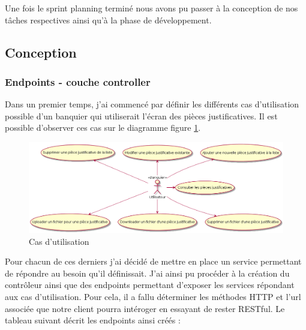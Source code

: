 	Une fois le sprint planning terminé nous avons pu passer à la conception de nos tâches respectives ainsi qu'à la phase de développement.

\subsection{Conception}

	\subsubsection{Endpoints - couche controller}

	Dans un premier temps, j'ai commencé par définir les différents cas d'utilisation possible d'un banquier qui utiliserait l'écran des pièces justificatives. Il est possible d'observer ces cas sur le diagramme figure \ref{useCasePJ}.

\begin{figure}[h!]
	\includegraphics[scale=0.50]{images/travailBP1818/piecesJustif/useCasePJ.png}
	\centering
	\caption{Cas d'utilisation}
	\label{useCasePJ}
\end{figure}

	Pour chacun de ces derniers j'ai décidé de mettre en place un service permettant de répondre au besoin qu'il définissait. J'ai ainsi pu procéder à la création du contrôleur ainsi que des endpoints permettant d'exposer les services répondant aux cas d'utilisation. Pour cela, il a fallu déterminer les méthodes HTTP et l'url associée que notre client pourra intéroger en essayant de rester RESTful. Le tableau suivant décrit les endpoints ainsi créés :
	
